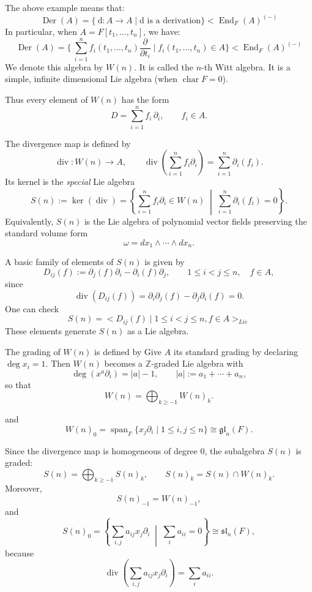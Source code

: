 \documentclass[11pt, a4paper]{report}
\begin{document}
The above example means that:
\[
\operatorname{Der}(A)=\{\ \mathrm{d}: A \to A \mid \mathrm{d} \text{ is a derivation} \} < \operatorname{End}_F(A)^{(-)}
\]
In particular, when $A=F[t_1,\ldots ,t_n]$, we have:
\[
\operatorname{Der}(A)=\{\ \sum_{i=1}^n f_i(t_1,\ldots ,t_n) \frac{\partial}{\partial t_i} \mid f_i(t_1,\ldots ,t_n) \in A \} < \operatorname{End}_F(A)^{(-)}
\]
We denote this algebra by $W(n)$. It is called the $n$-th Witt algebra. It is a simple, infinite dimensional Lie algebra (when $\operatorname{char}F=0$).

Thus every element of $W(n)$ has the form
\[
D=\sum_{i=1}^n f_i\,\partial_i,
\qquad f_i\in A.
\]

\begin{definition}
    The divergence map is defined by
\[
\operatorname{div}:W(n)\to A,
\qquad
\operatorname{div}\!\left(\sum_{i=1}^n f_i\partial_i\right)
=\sum_{i=1}^n \partial_i(f_i).
\]
Its kernel is the \emph{special} Lie algebra
\[
S(n):=\ker(\operatorname{div})
     =\left\{
        \sum_{i=1}^n f_i\partial_i\in W(n)
        \;\middle|\;
        \sum_{i=1}^n \partial_i(f_i)=0
      \right\}.
\]
Equivalently, $S(n)$ is the Lie algebra of polynomial vector fields preserving
the standard volume form
\[
\omega=dx_1\wedge\cdots\wedge dx_n.
\]
\end{definition}


A basic family of elements of $S(n)$ is given by
\[
D_{ij}(f):=\partial_j(f)\partial_i-\partial_i(f)\partial_j,
\qquad
1\le i<j\le n,\quad f\in A,
\]
since
\[
\operatorname{div}(D_{ij}(f))
=
\partial_i\partial_j(f)-\partial_j\partial_i(f)=0.
\]
One can check
\[
S(n)=< D_{ij}(f) \mid 1\le i<j\le n, f\in A >_{Lie}
\]
These elements generate $S(n)$ as a Lie algebra.

\begin{definition}
    The grading of $W(n)$ is defined by
Give $A$ its standard grading by declaring $\deg x_i=1$. Then $W(n)$ becomes a
$\mathbb Z$-graded Lie algebra with
\[
\deg(x^a\partial_i)=|a|-1,
\qquad
|a|:=a_1+\cdots+a_n,
\]
so that
\[
W(n)=\bigoplus_{k\ge -1} W(n)_k.
\]

and
\[
W(n)_0
=
\operatorname{span}_F\{x_j\partial_i\mid 1\le i,j\le n\}
\cong \mathfrak{gl}_n(F).
\]
\end{definition}
    

Since the divergence map is homogeneous of degree $0$, the subalgebra $S(n)$ is
graded:
\[
S(n)=\bigoplus_{k\ge -1} S(n)_k,
\qquad
S(n)_k=S(n)\cap W(n)_k.
\]
Moreover,
\[
S(n)_{-1}=W(n)_{-1},
\]
and
\[
S(n)_0
=
\left\{
\sum_{i,j} a_{ij}x_j\partial_i
\;\middle|\;
\sum_i a_{ii}=0
\right\}
\cong \mathfrak{sl}_n(F),
\]
because
\[
\operatorname{div}\!\left(\sum_{i,j} a_{ij}x_j\partial_i\right)
=
\sum_i a_{ii}.
\]
\end{document}
